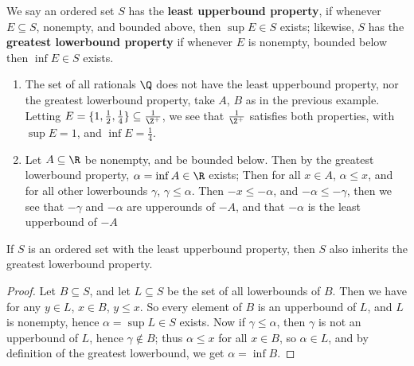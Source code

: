\begin{definition}
    We say an ordered set $S$ has the \textbf{least upperbound property}, if whenever 
    $E \subseteq S$, nonempty, and bounded above, then  $\sup{E} \in S$ exists; likewise, $S$ has 
    the \textbf{greatest lowerbound property} if whenever $E$ is nonempty, bounded below 
    then $\inf{E} \in S$ exists.
\end{definition}

\begin{example}
    \begin{enumerate}[label=(\arabic*)]
        \item The set of all rationals $\Q$ does not have the least upperbound property, nor the 
    greatest lowerbound property, take $A$,  $B$ as in the previous example. Letting  
    $E=\{1, \frac{1}{2}, \frac{1}{4}\} \subseteq \frac{1}{\Z^+}$, we see that $\frac{1}{\Z^+}$ 
    satisfies both properties, with $\sup{E}=1$, and  $\inf{E}=\frac{1}{4}$.

        \item Let $A \subseteq \R$ be nonempty, and be bounded below. Then by the greatest 
            lowerbound property,  $\alpha=\inf{A} \in \R$ exists; Then for all  $x \in A$, 
             $\alpha \leq x$, and for all other lowerbounds  $\gamma$,  $\gamma \leq \alpha$. Then 
              $-x \leq -\alpha$, and  $-\alpha \leq -\gamma$, then we see that  $-\gamma$ and  $-\alpha$ 
              are upperounds of  $-A$, and that  $-\alpha$ is the least upperbound of $-A$
    \end{enumerate}

\end{example} 

\begin{theorem}\label{1.1.2}
    If $S$ is an ordered set with the least upperbound property, then $S$ also inherits 
    the greatest lowerbound property.
\end{theorem}
\begin{proof}
    Let $B \subseteq S$, and let  $L \subseteq S$ be the set of all lowerbounds of $B$. Then we have 
    for any $y \in L$, $x \in B$, $y \leq x$. So every element of  $B$ is an upperbound of  $L$, and 
    $L$ is nonempty, hence $\alpha=\sup{L} \in S$ exists. Now if  $\gamma \leq \alpha$, then 
     $\gamma$ is not an upperbound of  $L$, hence  $\gamma \notin B$; thus  $\alpha \leq x$ for all 
      $x \in B$, so  $\alpha \in L$, and by definition of the greatest lowerbound, we get 
      $\alpha=\inf{B}$.
\end{proof}
